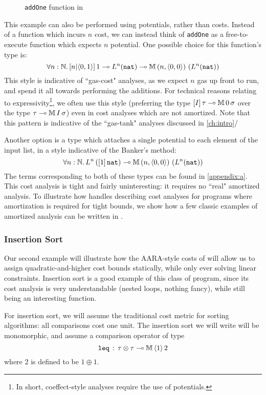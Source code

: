 \begin{figure}

\caption{\texttt{addOne} function in \dlambdaamor}
\label{fig:example-dlambdaamor-addone}
\end{figure}


This example can also be performed using potentials, rather than costs. Instead of a function which incurs $n$ cost, we can instead think of \texttt{addOne} as a free-to-execute function which expects $n$ potential. One possible choice for this function's type is:
$$\forall n : \mathbb{N} .\, [n|\langle 0,1 \rangle] \, 1 \multimap L^n(\texttt{nat}) \multimap \mathbb{M} \, (n,\langle 0,0 \rangle) \, \left(L^n(\texttt{nat})\right)$$
This style is indicative of ``gas-cost" analyses, as we expect $n$ gas up front to run, and spend it all towards performing the additions. For technical reasons relating to expressivity\footnote{
In short, coeffect-style analyses require the use of potentials.
}, we often use this style (preferring the type $[I] \, \tau \multimap \mathbb{M} \, 0 \, \sigma$ over the type $\tau \multimap \mathbb{M} \, I \, \sigma$) even in cost analyses which are not amortized. Note that this pattern is indicative of the ``gas-tank" analyses discussed in \autoref{ch:intro}/

Another option is a type which attaches a single potential to each element of the input list, in a style indicative of the Banker's method:
$$
\forall n : \mathbb{N} .\, L^n\left([1] \, \texttt{nat}\right) \multimap \mathbb{M} \, (n,\langle 0,0 \rangle) \, \left(L^n(\texttt{nat})\right)
$$
The terms corresponding to both of these types can be found in \autoref{appendix:a}. This cost analysis is tight and fairly uninteresting: it requires no ``real" amortized analysis. To illustrate how \dlambdaamor handles describing cost analyses for programs where amortization is required for tight bounds, we show how a few classic examples of amortized analysis can be written in \dlambdaamor.

\subsubsection{Insertion Sort}
Our second example will illustrate how the AARA-style costs of \dlambdaamor will allow us to assign quadratic-and-higher cost bounds statically, while only ever solving linear constraints. Insertion sort is a good example of this class of program, since its cost analysis is very understandable (nested loops, nothing fancy), while still being an interesting function.

For insertion sort, we will assume the traditional cost metric for sorting algorithms: all comparisons cost one unit. The insertion sort we will write will be monomorphic, and assume a comparison operator of type
$$
\texttt{leq} \, : \, \tau \otimes \tau \multimap \mathbb{M} \, \langle 1 \rangle \, 2
$$
where $2$ is defined to be $1 \oplus 1$.

